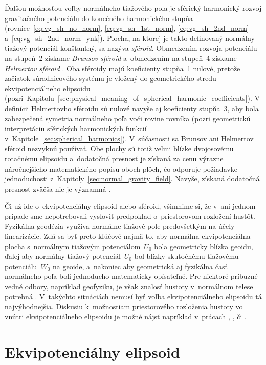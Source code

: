 \documentclass[a4paper, 12pt]{book}
\begin{document}
Ďalšou možnosťou voľby normálneho tiažového poľa je sférický harmonický rozvoj 
gravitačného potenciálu do konečného harmonického stupňa 
(rovnice~\ref{eq:vg_sh_no_norm}, \ref{eq:vg_sh_1st_norm}, 
\ref{eq:vg_sh_2nd_norm} a~\ref{eq:vg_sh_2nd_norm_ynk}).  Plocha, na ktorej je 
takto definovaný normálny tiažový potenciál konštantný, sa nazýva 
\emph{sféroid}.  Obmedzením rozvoja potenciálu na stupeň~2 získame 
\emph{Brunsov sféroid} a~obmedzením na stupeň~4 získame \emph{Helmertov 
sféroid} \parencite{Moritz1967}.  Oba sféroidy majú koeficienty stupňa~1 
nulové, pretože začiatok súradnicového systému je vložený do geometrického 
stredu ekvipotenciálneho elipsoidu 
(pozri~Kapitolu~\ref{sec:physical_meaning_of_spherical_harmonic_coefficients}).  
V definícii Helmertovho sféroidu sú nulové navyše aj koeficienty stupňa~3, aby 
bola zabezpečená symetria normálneho poľa voči rovine rovníka (pozri 
geometrickú interpretáciu sférických harmonických funkcií 
v~Kapitole~\ref{sec:spherical_harmonics}).   V~súčasnosti sa Brunsov ani 
Helmertov sféroid nezvyknú používať.  Obe plochy sú totiž veľmi blízke 
dvojosovému rotačnému elipsoidu a~dodatočná presnosť je získaná za cenu výrazne 
náročnejšieho matematického popisu oboch plôch, čo odporuje požiadavke 
jednoduchosti z~Kapitoly~\ref{sec:normal_gravity_field}.  Navyše, získaná 
dodatočná presnosť zväčša nie je významná \parencite{Moritz1967}.

Či už ide o~ekvipotenciálny elipsoid alebo sféroid, všimnime si, že v~ani 
jednom prípade sme nepotrebovali vysloviť predpoklad o~priestorovom rozložení 
hustôt.  Fyzikálna geodézia využíva normálne tiažové pole predovšetkým na účely 
linearizácie.  Zdá sa byť preto kľúčové najmä to, aby normálna ekvipotenciálna 
plocha s~normálnym tiažovým potenciálom~$U_0$ bola geometricky blízka geoidu, 
ďalej aby normálny tiažový potenciál~$U_0$ bol blízky skutočnému tiažovému 
potenciálu~$W_0$ na geoide, a~nakoniec aby geometrická aj fyzikálna časť 
normálneho poľa boli jednoducho matematicky opísateľné.  Pre niektoré príbuzné 
vedné odbory, napríklad geofyziku, je však znalosť hustoty v~normálnom telese 
potrebná \parencite{Karcol2017}.  V~takýchto situáciách nemusí byť voľba 
ekvipotenciálneho elipsoidu tá najvýhodnejšia.  Diskusiu k~možnostiam 
priestorového rozloženia hustoty vo vnútri ekvipotenciálneho elipsoidu je možné 
nájsť napríklad v~prácach \textcite{MoritzTheFigureOfTheEarth}, 
\textcite{TorgeGeodesy}, \textcite{Conway2000} či \textcite{Karcol2017}.



\section{Ekvipotenciálny elipsoid}
\label{sec:equipotential_ellipsoid}
\end{document}
